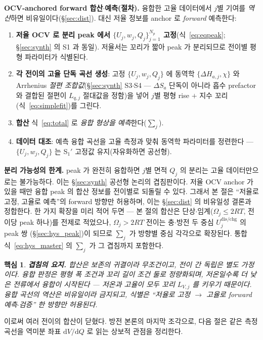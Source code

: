 \documentclass[11pt,a4paper]{article}
\newtheorem*{keybox}{핵심}
\newcommand{\dd}{\mathrm{d}}
\newcommand{\dis}{\mathrm{dis}}
\newcommand{\chg}{\mathrm{chg}}
\begin{document}
\textbf{OCV-anchored forward 합산$\cdot$예측(절차).} 융합한 고율 데이터에서 $j$별 기여를 \emph{역산}하면 비유일이다(\S\ref{sec:dist}). 대신 저율 정보를 anchor 로 \emph{forward} 예측한다:
\begin{enumerate}[label=\textbf{S$_\arabic*'$.},leftmargin=2.8em,itemsep=2pt]
\item \textbf{저율 OCV 로 분리 peak 에서 $\{U_j,w_j,Q_j\}_{j=1}^{N_p}$ 고정}(식~\eqref{eq:eqpeak}; \S\ref{sec:synth}
  의 S1 과 동일). 저율서는 꼬리가 짧아 peak 가 분리되므로 전이별 평형 파라미터가 식별된다.
\item \textbf{각 전이의 고율 단독 곡선 생성}: 고정 $\{U_j,w_j,Q_j\}$ 에 동역학 $\{\Delta H_{a,j},\chi\}$ 와 Arrhenius
  \emph{절편 조합값}(\S\ref{sec:synth} S3$\cdot$S4 — $\Delta S_a$ 단독이 아니라 흡수 prefactor 와 결합된 절편이
  $L_{q,j}$ 절대값을 정함)을 넣어 $j$별 평형 rise $+$ 지수 꼬리(식~\eqref{eq:simplefit})를 그린다.
\item \textbf{합산} 식~\eqref{eq:total} 로 \emph{융합 형상을 예측}한다($\sum_j$).
\item \textbf{데이터 대조}: 예측 융합 곡선을 고율 측정과 맞춰 동역학 파라미터를 정련한다 — $\{U_j,w_j,Q_j\}$ 는
  S$_1'$ 고정값 유지(자유화하면 공선형).
\end{enumerate}
\textbf{분리 가능성의 한계.} peak 가 완전히 융합하면 $j$별 면적 $Q_j$ 의 분리는 고율 데이터만으로는 불가능하다.
이는 \S\ref{sec:synth} 공선형 논리의 겹침판이다. 저율 OCV anchor 가 있을 때만 융합 peak 의 합산 정보를 전이별로
되돌릴 수 있다. 그래서 본 절은 ``저율로 고정, 고율로 예측''의 forward 방향만 허용하며, 이는 \S\ref{sec:dist}
의 비유일성 결론과 정합한다. 한 가지 확장을 미리 적어 두면 — 본 절의 합산은 단상$\cdot$임계($\Omega_j\le2RT$,
전이당 peak 하나)를 전제로 적었으나, $\Omega_j>2RT$ 전이는 충$\cdot$방전 두 중심 $U_j^{\dis/\chg}$ 의 peak 쌍
(\S\ref{sec:hys_peak})이 되므로 $\sum_j$ 가 방향별 중심 각각으로 확장된다. 통합식~\eqref{eq:hys_master} 의
$\sum_j$ 가 그 겹침까지 포함한다. \begin{keybox}
\textbf{겹침의 요지.} 합산은 보존의 귀결이라 무조건이고, 전이 간 독립은 별도 가정이다. 융합 판정은 평형 폭
조건과 꼬리 길이 조건 둘로 정량화되며, 저온일수록 더 낮은 전류에서 융합이 시작된다 — 저온과 고율이 모두 꼬리
$L_{V,j}$ 를 키우기 때문이다. 융합 곡선의
역산은 비유일이라 금지되고, 식별은 ``저율로 고정 $\to$ 고율로 forward 예측$\cdot$검증'' 한 방향만 허용된다.
\end{keybox}
이로써 여러 전이의 합산이 닫혔다. 방전 본론의 마지막 조각으로, 다음 절은 같은
측정 곡선을 역미분 좌표 $\dd V/\dd Q$ 로 읽는 상보적 관점을 정리한다.
\end{document}
